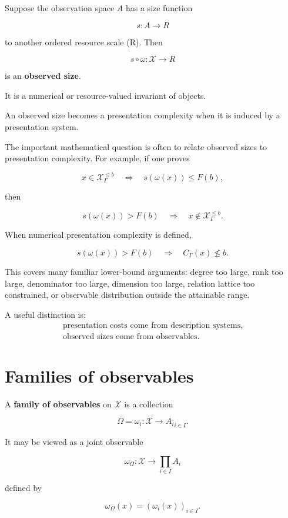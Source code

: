 \documentclass[11pt]{article}
\begin{document}
Suppose the observation space \(A\) has a size function

\[
s:A\to R
\]

to another ordered resource scale (R). Then

\[
s\circ\omega:\mathcal X\to R
\]

is an \textbf{observed size}.

It is a numerical or resource-valued invariant of objects.

An observed size becomes a presentation complexity when it is induced by a presentation system.

The important mathematical question is often to relate observed sizes to presentation complexity. For example, if one proves

\[
x\in\mathcal X_\Gamma^{\leq b}
\quad\Longrightarrow\quad
s(\omega(x))\leq F(b),
\]

then

\[
s(\omega(x))>F(b)
\quad\Longrightarrow\quad
x\notin\mathcal X_\Gamma^{\leq b}.
\]

When numerical presentation complexity is defined,

\[
s(\omega(x))>F(b)
\quad\Longrightarrow\quad
C_\Gamma(x)\nleq b.
\]

This covers many familiar lower-bound arguments: degree too large, rank too large, denominator too large, dimension too large, relation lattice too constrained, or observable distribution outside the attainable range.

A useful distinction is:
\[
\begin{gathered}
\text{presentation costs come from description systems,}\\
\text{observed sizes come from observables.}
\end{gathered}
\]


\section{Families of observables}

A \textbf{family of observables} on \(\mathcal X\) is a collection

\[
\Omega={\omega_i:\mathcal X\to A_i}_{i\in I}.
\]

It may be viewed as a joint observable

\[
\omega_\Omega:\mathcal X\to \prod_{i\in I}A_i
\]

defined by

\[
\omega_\Omega(x)=(\omega_i(x))_{i\in I}.
\]
\end{document}
